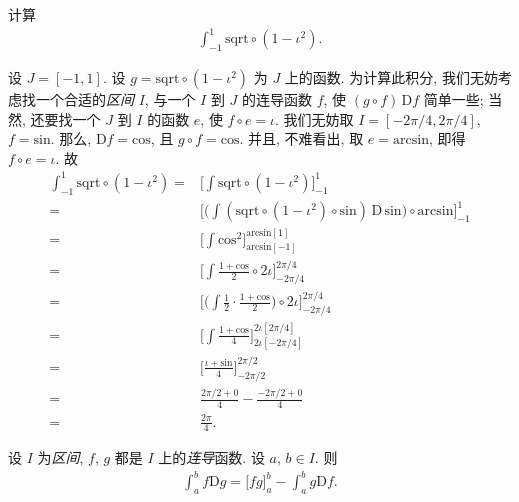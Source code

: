 \begin{example}
    计算
    \begin{align*}
        \int_{-1}^{1} {\mathrm{sqrt} \circ (1 - \iota^2)}.
    \end{align*}

    设 $J = [-1, 1]$.
    设 $g = \mathrm{sqrt} \circ (1 - \iota^2)$ 为 $J$ 上的函数.
    为计算此积分, 我们无妨考虑找一个合适的\emph{区间} $I$,
    与一个 $I$ 到 $J$ 的连导函数 $f$,
    使 $(g \circ f)\,\mathrm{D}f$ 简单一些;
    当然, 还要找一个 $J$ 到 $I$ 的函数 $e$,
    使 $f \circ e = \iota$.
    我们无妨取
    $I = [-2\pi/4, 2\pi/4]$, $f = \mathrm{sin}$.
    那么, $\mathrm{D}f = \mathrm{cos}$,
    且 $g \circ f = \mathrm{cos}$.
    并且, 不难看出, 取 $e = \mathrm{arcsin}$,
    即得 $f \circ e = \iota$.
    故
    \begin{align*}
        \int_{-1}^{1} {\mathrm{sqrt} \circ (1 - \iota^2)}
        = {} & \Bigg[ \int {\mathrm{sqrt} \circ (1 - \iota^2)} \Bigg]_{-1}^{1}   \\
        = {} & \Bigg[ \Bigg( \int {(\mathrm{sqrt} \circ (1 - \iota^2)
                \circ \mathrm{sin})\,\mathrm{D}\,\mathrm{sin}} \Bigg)
        \circ \mathrm{arcsin} \Bigg]_{-1}^{1}                                    \\
        = {} & \Bigg[ \int {\mathrm{cos}^2} \Bigg]
        _{\mathrm{arcsin}[-1]}^{\mathrm{arcsin}[1]}                              \\
        = {} & \Bigg[ \int {\frac{1 + \mathrm{cos}}{2} \circ {2\iota}} \Bigg]
        _{-2\pi/4}^{2\pi/4}                                                      \\
        = {} & \Bigg[ \Bigg( \int {\frac{1}{2} \cdot \frac{1 + \mathrm{cos}}{2}}
        \Bigg) \circ {2\iota} \Bigg]_{-2\pi/4}^{2\pi/4}                          \\
        = {} & \Bigg[ \int {\frac{1 + \mathrm{cos}}{4}}
        \Bigg]_{2\iota[-2\pi/4]}^{2\iota[2\pi/4]}                                \\
        = {} & \Bigg[ \frac{\iota + \mathrm{sin}}{4}
        \Bigg]_{-2\pi/2}^{2\pi/2}                                                \\
        = {} & \frac{2\pi/2 + 0}{4} - \frac{-2\pi/2 + 0}{4}                      \\
        = {} & \frac{2\pi}{4}.
    \end{align*}
\end{example}

\begin{theorem}
    设 $I$ 为\emph{区间},
    $f$, $g$ 都是 $I$ 上的\emph{连导}函数.
    设 $a$, $b \in I$.
    则
    \begin{align*}
        \int_{a}^{b} {f\mathrm{D}g} = \big[ fg \big]_{a}^{b} - \int_{a}^{b} {g\mathrm{D}f}.
    \end{align*}
\end{theorem}

